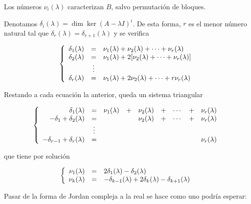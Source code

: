 \documentclass[../ecuaciones_diferenciales.tex]{subfiles}
\begin{document}
  \begin{remark}
    Los números \(\nu_i(\lambda)\) caracterizan \(B\), salvo permutación de bloques.
  \end{remark}
  
  Denotamos \(\delta_i(\lambda) = \dim \ker (A - \lambda I)^i\). De esta forma,
  \(r\) es el menor número natural tal que \(\delta_r(\lambda) =
  \delta_{r+1}(\lambda)\) y se verifica

  \[\left\{
      \begin{array}[ht]{r c l}
        \delta_1(\lambda) & = & \nu_1(\lambda) + \nu_2(\lambda) + \cdots +
                            \nu_r(\lambda) \\
        \delta_2(\lambda) & = & \nu_1(\lambda) + 2[\nu_2(\lambda) + \cdots +
                            \nu_r(\lambda)] \\
        & \vdots & \\
        \delta_r(\lambda) & = & \nu_1(\lambda) + 2\nu_2(\lambda) + \cdots + r\nu_r(\lambda)
      \end{array}
      \right.
    \]

    Restando a cada ecuación la anterior, queda un sistema triangular

  \[\left\{
      \begin{array}[ht]{r c c c c c c c c}
        \delta_1(\lambda) & = & \nu_1(\lambda) & + & \nu_2(\lambda) & + & \cdots & + & \nu_r(\lambda) \\
        -\delta_1 + \delta_2(\lambda) & = & & & \nu_2(\lambda) & + & \cdots & + & \nu_r(\lambda) \\
        & \vdots & \\
        -\delta_{r-1} + \delta_r(\lambda) & = & & & & & & & \nu_r(\lambda)
      \end{array}
      \right.
    \]

    que tiene por solución

    \[\left\{
        \begin{array}[ht]{r c l}
          \nu_1(\lambda) & = & 2\delta_1(\lambda) - \delta_2(\lambda) \\
          \nu_k(\lambda) & = & -\delta_{k-1}(\lambda) + 2\delta_k(\lambda) - \delta_{k+1}(\lambda)
        \end{array}
      \right.
    \]

    Pasar de la forma de Jordan compleja a la real se hace como uno podría
    esperar:
\end{document}
